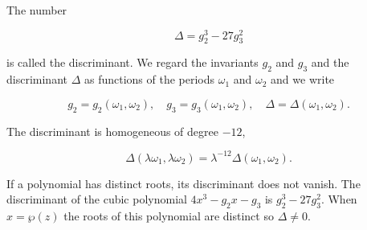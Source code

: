 The number

$$\Delta = g_2^3 - 27g_3^2$$

is called the discriminant. We regard the invariants $g_2$ and $g_3$ and the discriminant $\Delta$ as functions of the periods $\omega_1$ and $\omega_2$ and we write

$$g_2 = g_2(\omega_1, \omega_2), \quad g_3 = g_3(\omega_1, \omega_2), \quad \Delta = \Delta(\omega_1, \omega_2).$$

The discriminant is homogeneous of degree $-12$,

$$\Delta(\lambda\omega_1, \lambda\omega_2) = \lambda^{-12}\Delta(\omega_1, \omega_2).$$

If a polynomial has distinct roots, its discriminant does not vanish. The discriminant of the cubic polynomial $4x^3 - g_2x - g_3$ is $g_2^3 - 27g_3^2$. When $x = \wp(z)$ the roots of this polynomial are distinct so $\Delta \neq 0$.
